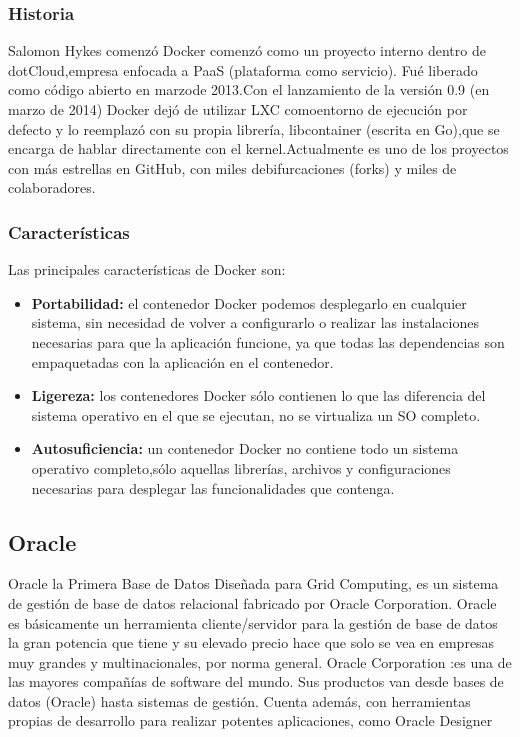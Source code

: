 \documentclass[preprint,12pt]{elsarticle}
\begin{document}
\subsubsection{\textbf{Historia}}
Salomon Hykes comenzó Docker comenzó como un proyecto interno dentro de dotCloud,empresa enfocada a PaaS (plataforma como servicio). Fué liberado como código abierto en marzode 2013.Con el lanzamiento de la versión 0.9 (en marzo de 2014) Docker dejó de utilizar LXC comoentorno de ejecución por defecto y lo reemplazó con su propia librería, libcontainer (escrita en Go),que se encarga de hablar directamente con el kernel.Actualmente es uno de los proyectos con más estrellas en GitHub, con miles debifurcaciones (forks) y miles de colaboradores.

\subsubsection{\textbf{Características}}
Las principales características de Docker son:


\begin{itemize}
\item \textbf{Portabilidad:} el contenedor Docker podemos desplegarlo en cualquier sistema, sin necesidad de volver a configurarlo o realizar las instalaciones necesarias para que la aplicación funcione, ya que todas las dependencias son empaquetadas con la aplicación en el contenedor.

\item \textbf{Ligereza:} los contenedores Docker sólo contienen lo que las diferencia del sistema operativo en el que se ejecutan, no se virtualiza un SO completo.

\item \textbf{Autosuficiencia:} un contenedor Docker no contiene todo un sistema operativo completo,sólo aquellas librerías, archivos y configuraciones necesarias para desplegar las funcionalidades que contenga.
\end{itemize}


\subsection{\textbf{Oracle}}
Oracle la Primera Base de Datos Diseñada para Grid Computing, es un sistema de gestión de base de datos relacional fabricado por Oracle Corporation.
Oracle es básicamente un herramienta cliente/servidor para la gestión de base de datos la gran potencia que tiene y su elevado precio hace que solo se vea en empresas muy grandes y multinacionales, por norma general.
Oracle Corporation :es una de las mayores compañías de software del mundo. Sus productos van desde bases de datos (Oracle) hasta sistemas de gestión. Cuenta además, con herramientas propias de desarrollo para realizar potentes aplicaciones, como Oracle Designer
\end{document}
